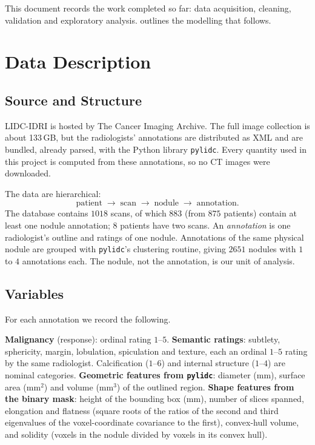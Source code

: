 \documentclass[12pt]{article}
\begin{document}
This document records the work completed so far: data
acquisition, cleaning, validation and exploratory analysis.
 outlines the modelling that follows.

\section{Data Description}

\subsection{Source and Structure}

LIDC-IDRI is hosted by The Cancer Imaging
Archive\cite{clark2013tcia}. The full image collection is about
133\,GB, but the radiologists' annotations are distributed as XML
and are bundled, already parsed, with the Python library
\texttt{pylidc}\cite{hancock2016pylidc}. Every quantity used in
this project is computed from these annotations, so no CT images
were downloaded.

The data are hierarchical:
\[
  \text{patient} \;\to\; \text{scan} \;\to\; \text{nodule}
  \;\to\; \text{annotation}.
\]
The database contains $1018$ scans, of which $883$ (from $875$
patients) contain at least one nodule annotation; $8$ patients
have two scans. An \emph{annotation} is one radiologist's outline
and ratings of one nodule. Annotations of the same physical
nodule are grouped with \texttt{pylidc}'s clustering routine,
giving $2651$ nodules with $1$ to $4$ annotations each. The
nodule, not the annotation, is our unit of analysis.

\subsection{Variables}

For each annotation we record the following.
\begin{itemize}
  \ii \textbf{Malignancy} (response): ordinal rating $1$--$5$.
  \ii \textbf{Semantic ratings}: subtlety, sphericity, margin,
    lobulation, spiculation and texture, each an ordinal $1$--$5$
    rating by the same radiologist. Calcification ($1$--$6$) and
    internal structure ($1$--$4$) are nominal categories.
  \ii \textbf{Geometric features from \texttt{pylidc}}: diameter
    (mm), surface area (mm$^2$) and volume (mm$^3$) of the
    outlined region.
  \ii \textbf{Shape features from the binary mask}: height of the
    bounding box (mm), number of slices spanned, elongation and
    flatness (square roots of the ratios of the second and third
    eigenvalues of the voxel-coordinate covariance to the first),
    convex-hull volume, and solidity (voxels in the nodule divided
    by voxels in its convex hull).
\end{itemize}
\end{document}
